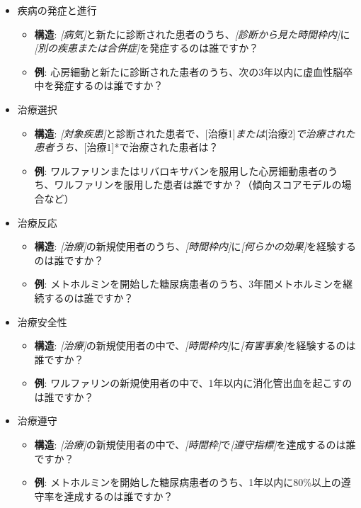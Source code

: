\documentclass[
  11pt]{book}
\providecommand{\tightlist}{%
  \setlength{\itemsep}{0pt}\setlength{\parskip}{0pt}}
\theoremstyle{definition}
\theoremstyle{definition}
\theoremstyle{definition}
\theoremstyle{definition}
\theoremstyle{remark}
\begin{document}
\begin{itemize}
\tightlist
\item
  疾病の発症と進行

  \begin{itemize}
  \tightlist
  \item
    \textbf{構造}: \emph{{[}病気{]}}と新たに診断された患者のうち、\emph{{[}診断から見た時間枠内{]}}に\emph{{[}別の疾患または合併症{]}}を発症するのは誰ですか？
  \item
    \textbf{例}: 心房細動と新たに診断された患者のうち、次の3年以内に虚血性脳卒中を発症するのは誰ですか？
  \end{itemize}
\item
  治療選択

  \begin{itemize}
  \tightlist
  \item
    \textbf{構造}: \emph{{[}対象疾患{]}}と診断された患者で\emph{、}{[}治療1{]}\emph{または}{[}治療2{]}\emph{で治療された患者うち、}{[}治療1{]}*で治療された患者は？
  \item
    \textbf{例}: ワルファリンまたはリバロキサバンを服用した心房細動患者のうち、ワルファリンを服用した患者は誰ですか？（傾向スコアモデルの場合など）
  \end{itemize}
\item
  治療反応

  \begin{itemize}
  \tightlist
  \item
    \textbf{構造}: \emph{{[}治療{]}}の新規使用者のうち、\emph{{[}時間枠内{]}}に\emph{{[}何らかの効果{]}}を経験するのは誰ですか？
  \item
    \textbf{例}: メトホルミンを開始した糖尿病患者のうち、3年間メトホルミンを継続するのは誰ですか？
  \end{itemize}
\item
  治療安全性

  \begin{itemize}
  \tightlist
  \item
    \textbf{構造}: \emph{{[}治療{]}}の新規使用者の中で、\emph{{[}時間枠内{]}}に\emph{{[}有害事象{]}}を経験するのは誰ですか？
  \item
    \textbf{例}: ワルファリンの新規使用者の中で、1年以内に消化管出血を起こすのは誰ですか？
  \end{itemize}
\item
  治療遵守

  \begin{itemize}
  \tightlist
  \item
    \textbf{構造}: \emph{{[}治療{]}}の新規使用者の中で、\emph{{[}時間枠{]}}で\emph{{[}遵守指標{]}}を達成するのは誰ですか？
  \item
    \textbf{例}: メトホルミンを開始した糖尿病患者のうち、1年以内に80\%以上の遵守率を達成するのは誰ですか？
  \end{itemize}
\end{itemize}
\end{document}
